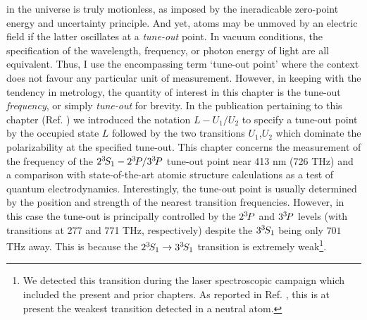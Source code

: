 	 in the universe is truly motionless, as imposed by the ineradicable zero-point energy and uncertainty principle.
	And yet, atoms may be unmoved by an electric field if the latter oscillates at a \emph{tune-out} point.
	In vacuum conditions, the specification of the wavelength, frequency, or photon energy of light are all equivalent. 
	Thus, I use the encompassing term `tune-out point' where the context does not favour any particular unit of measurement.
	However, in keeping with the tendency in metrology, the quantity of interest in this chapter is the tune-out \emph{frequency}, or simply \emph{tune-out} for brevity. 
	In the publication pertaining to this chapter (Ref. \cite{Henson22}) we introduced the notation $L-U_1/U_2$ to specify a tune-out point by the occupied state $L$ followed by the two transitions $U_1$,$U_2$ which dominate the polarizability at the specified tune-out. 
	This chapter concerns the measurement of the frequency of the $2^{3\!}S_1-2^{3\!} P/3^{3\!} P$ tune-out point near 413 nm (726 THz) \cite{Henson15,Mitroy13} and a comparison with state-of-the-art atomic structure calculations as a test of quantum electrodynamics.
	Interestingly, the tune-out point is usually determined by the position and strength of the nearest transition frequencies. 
	However, in this case the tune-out is principally controlled by the $2^{3\!} P$ and $3^{3\!} P$ levels (with transitions at 277 and 771 THz, respectively) despite the $3 ^{3\!} S_1$ being only $701$ THz away. This is because the  $2^{3\!}S_1 \rightarrow 3^{3\!}S_1 $ transition is extremely weak\footnote{We detected this transition during the laser spectroscopic campaign which included the present and prior chapters. As reported in Ref. \cite{Thomas20}, this is at present the weakest transition detected in a neutral atom.}.

